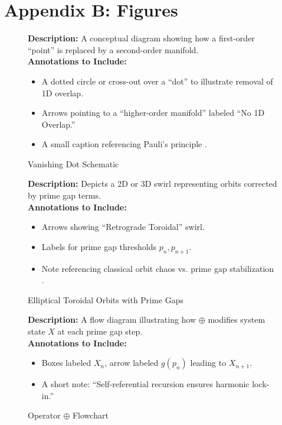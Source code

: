 \documentclass[11pt]{article}
\begin{document}
\clearpage

\section{Appendix B: Figures}
\label{appendixb}

\begin{figure}[p]
\caption{Vanishing Dot Schematic}
\label{fig:vanishDot}
\textbf{Description:}  
A conceptual diagram showing how a first-order “point” is replaced by a second-order manifold.  
\\[0.5em]
\textbf{Annotations to Include:}
\begin{itemize}
    \item A dotted circle or cross-out over a “dot” to illustrate removal of 1D overlap.
    \item Arrows pointing to a “higher-order manifold” labeled “No 1D Overlap.”
    \item A small caption referencing Pauli’s principle \cite{Pauli1925}.
\end{itemize}
\end{figure}

\begin{figure}[p]
\caption{Elliptical Toroidal Orbits with Prime Gaps}
\label{fig:ellipticalOrbits}
\textbf{Description:}  
Depicts a 2D or 3D swirl representing orbits corrected by prime gap terms.
\\[0.5em]
\textbf{Annotations to Include:}
\begin{itemize}
    \item Arrows showing “Retrograde Toroidal” swirl.
    \item Labels for prime gap thresholds $p_n, p_{n+1}$.
    \item Note referencing classical orbit chaos vs. prime gap stabilization \cite{Poincare1892}.
\end{itemize}
\end{figure}

\begin{figure}[p]
\caption{Operator $\oplus$ Flowchart}
\label{fig:oplusFlow}
\textbf{Description:}  
A flow diagram illustrating how $\oplus$ modifies system state $X$ at each prime gap step.
\\[0.5em]
\textbf{Annotations to Include:}
\begin{itemize}
    \item Boxes labeled $X_n$, arrow labeled $g(p_n)$ leading to $X_{n+1}$.
    \item A short note: “Self-referential recursion ensures harmonic lock-in.”
\end{itemize}
\end{figure}
\end{document}
